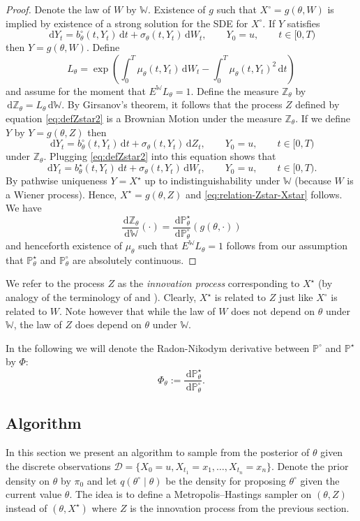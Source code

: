 \documentclass[preprint]{imsart}
\renewcommand{\th}{\theta}
\newcommand{\scr}[1]{{\mathcal #1}}
\newcommand{\bb}[1]{\mathbb{#1}}
\theoremstyle{definition}
\newcommand{\dd}{{\,\mathrm d}}
\begin{document}
\begin{proof}Denote the law of $W$ by $\bb{W}$.
Existence of $g$ such that $X^\circ=g(\th, W)$ is implied by existence of a strong solution for the SDE for $X^\circ$. 
If $Y$ satisfies \[\dd Y_t = b_\th^\circ(t, Y_t) \dd t + \sigma_\th(t, Y_t) \dd W_t, \qquad Y_0=u,\qquad t \in [0,T) \]
then 
$Y = g(\th,W)$. 
Define
\[ L_\th = \exp\left(\int_0^T \mu_\th(t,Y_t) \dd W_t - \int_0^T \mu_\th(t,Y_t)^2 \dd t\right) \]
and assume for the moment that  $E^{\mathbb{W}} L_\th=1$. Define the measure $\mathbb{Z}_\th$ by $\dd \mathbb{Z}_\th = L_\th \dd \mathbb{W}$. 
By Girsanov's theorem, it follows that the process $Z$ defined by equation \eqref{eq:defZstar2} is a Brownian Motion under the measure $\mathbb{Z}_\th$. If we define $Y$ by $Y=g(\th,Z)$  then
\[\dd Y_t = b_\th^\circ(t, Y_t) \dd t + \sigma_\th(t, Y_t) \dd Z_t, \qquad Y_0=u,\qquad t \in [0,T) \]
under $\mathbb{Z}_\th$.
Plugging \eqref{eq:defZstar2}  into this equation shows that 
\[\dd Y_t = b^\star_\th(t, Y_t) \dd t + \sigma_\th(t, Y_t) \dd W_t, \qquad Y_0=u,\qquad t \in [0,T). \]
By pathwise uniqueness $Y=X^\star$ up to indistinguishability under $\bb{W}$ (because $W$ is a Wiener process). 
Hence, $X^\star=g(\th,Z)$ and \eqref{eq:relation-Zstar-Xstar} follows.
 We have
\begin{equation}\label{change}
 \frac{\dd \mathbb{Z}_\th}{\dd \mathbb{W}}(\cdot) =  \frac{\dd \mathbb{P}_\th^\star}{\dd \mathbb{P}_\th^\circ} (g(\th,\cdot))
\end{equation}
and henceforth  existence of $\mu_\th$ such that $E^{\mathbb{W}} L_\th=1$ follows from our assumption that $\mathbb{P}^\star_\th$ and $\mathbb{P}^\circ_\th$ are absolutely continuous. 
\end{proof}


We refer to the process $Z$ as the  {\it innovation process} corresponding to $X^\star$ (by analogy of the terminology of \cite{GolightlyWilkinsonChapter} and  \cite{ChibPittShephard}). 
Clearly, $X^\star$ is related to $Z$ just like $X^\circ$ is related to $W$. Note however that while the law of  $W$ does not depend on $\th$ under $\mathbb{W}$, the law of $Z$ does depend on $\th$ under $\mathbb{W}$.


In the following we will denote the Radon-Nikodym derivative between $\mathbb{P}^\circ$ and $\mathbb{P}^\star$ by $\Phi$: \[ \Phi_\th:= \frac{\dd \mathbb{P}_\th^\star}{\dd \mathbb{P}_\th^\circ}.\]




\subsection{Algorithm}\label{sec:algo}
In this section we present an algorithm to  sample from the posterior of $\th$  given the discrete observations  $\scr{D}=\{X_0 = u, X_{t_1} = x_1, \ldots, X_{t_n} = x_{n}\}$. Denote the prior density on $\th$ by $\pi_0$ and let $q(\th^\circ \mid \th)$ be the density for proposing $\th^\circ$ given the current value $\th$. 
The idea is to define a Metropolis--Hastings sampler on $(\th, Z)$ instead of $(\th, X^\star)$ where $Z$ is the innovation process from the previous section.  
\end{document}
